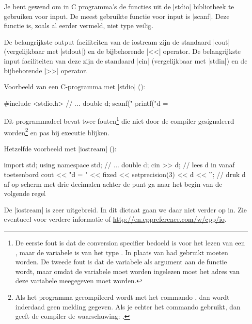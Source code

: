 \begin{cpplstShortInline}
Je bent gewend om in C programma's de functies uit de |stdio| bibliotheek te gebruiken voor input.
De meest gebruikte functie voor input is |scanf|.
Deze functie is, zoals al eerder vermeld, niet type veilig.

De belangrijkste output faciliteiten van de iostream  zijn de standaard  |cout| (vergelijkbaar met |stdout|) en de bijbehorende |<<| operator.
De belangrijkste input faciliteiten van deze  zijn de standaard  |cin| (vergelijkbaar met |stdin|) en de bijbehorende |>>| operator.

Voorbeeld van een C-programma met |stdio| ():
\begin{cpplstfragment}[style=cstyle,mathescape=true]
#include <stdio.h>
//  ...
	double d;
	scanf("%
	printf("d = %
\end{cpplstfragment}

Dit programmadeel bevat twee fouten\footnote{%
	De eerste fout is dat de conversion specifier  bedoeld is voor het lezen van een , maar de variabele  is van het type .
	In plaats van  had  gebruikt moeten worden.
	De tweede fout is dat de variabele  als argument aan de functie  wordt, maar omdat de variabele moet worden ingelezen moet het adres van deze variabele  meegegeven moet worden.
} die niet door de compiler gesignaleerd worden\footnote{%
	Als het programma gecompileerd wordt met het commando , dan wordt inderdaad geen melding gegeven. Als je echter het commando  gebruikt, dan geeft de compiler de waarschuwing: 
	.
} en pas bij executie blijken.

Hetzelfde voorbeeld met |iostream| ():
\begin{cpplstfragment}
import std;
using namespace std;
//  ...
	double d;
	cin >> d; // lees d in vanaf toetsenbord
	cout << "d = " << fixed << setprecision(3) << d << '\n'; // druk d af op scherm met drie decimalen achter de punt ga naar het begin van de volgende regel
\end{cpplstfragment}

De |iostream|  is zeer uitgebreid.
In dit dictaat gaan we daar niet verder op in.
Zie eventueel voor verdere informatie \cite[hoofdstuk 6: \href{http://www.icce.rug.nl/documents/cplusplus/cplusplus06.html}{IOStreams}]{Brokken2019} of \url{http://en.cppreference.com/w/cpp/io}.


\end{cpplstShortInline}
